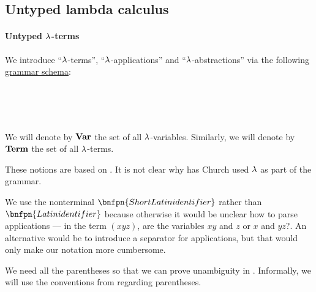 \subsection{Untyped lambda calculus}\label{subsec:untyped_lambda_calculus}

\paragraph{Untyped \( \synlambda \)-terms}

\begin{definition}\label{def:untyped_lambda_term}\mimprovised
  We introduce \enquote{\( \synlambda \)-terms}, \enquote{\( \synlambda \)-applications} and \enquote{\( \synlambda \)-abstractions} via the following \hyperref[def:formal_grammar/schema]{grammar schema}:
  \begin{bnf*}
        {} \\
     {\bnftsq{\( ( \)} \bnfsp {} \bnfsp {} \bnfsp \bnftsq{\( ) \)}} \\
     {\bnftsq{\( ( \)} \bnfsp \bnftsq{\( \synlambda \)} \bnfsp {} \bnfsp {} \bnfsp {} \bnfsp \bnftsq{\( ) \)}} \\
            { \bnfor {} \bnfor {}}
  \end{bnf*}

  \begin{thmenum}
     We will denote by \( \op*{Var} \) the set of all \( \synlambda \)-variables.
     Similarly, we will denote by \( \op*{Term} \) the set of all \( \synlambda \)-terms.
  \end{thmenum}
\end{definition}
\begin{comments}
  \item These notions are based on \cite[352]{Church1932}. It is not clear why has Church used \( \synlambda \) as part of the grammar.

  \item We use the nonterminal \( \bnfpn{Short Latin identifier} \) rather than \( \bnfpn{Latin identifier} \) because otherwise it would be unclear how to parse applications --- in the term \( (xyz) \), are the variables \( xy \) and \( z \) or \( x \) and \( yz \)?. An alternative would be to introduce a separator for applications, but that would only make our notation more cumbersome.

  \item We need all the parentheses so that we can prove unambiguity in . Informally, we will use the conventions from  regarding parentheses.
\end{comments}


